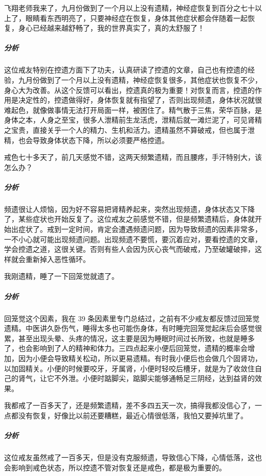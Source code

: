 \begin{case}
    飞翔老师我来了，九月份做到了一个月以上没有遗精，神经症恢复到百分之七十以上了，眼睛看东西明亮了，只要神经症在恢复，身体其他症状都会伴随着一起恢复，身心已经越来越舒畅了，我的世界真实了，真的太舒服了！
    \subparagraph{分析} 这位戒友特别在控遗方面下了功夫，认真研读了控遗的文章，自己也有控遗的经验，九月份做到了一个月以上没有遗精，神经症恢复很多，其他症状也恢复不少，身心大为改善。从这个反馈可以看出，控遗真的极为重要！对恢复而言，控遗的作用是决定性的，控遗做得好，身体恢复就有指望了，否则出现频遗，身体状况就很难起色，就像做事情无法打开局面一样，被困住了。精气散于三焦，荣华百脉，是身体之本，人身之至宝，很多人泄精前生龙活虎，泄精后就一滩烂泥了，可见肾精之宝贵，直接关乎一个人的精力、生机和活力。遗精虽然不算破戒，但也属于泄精，也会导致身体状态下降，所以必须要严格控遗。
\end{case}

\begin{case}
    戒色七十多天了，前几天感觉不错，这两天频繁遗精，而且腰疼，手汗特别大，该怎么办？
    \subparagraph{分析} 频遗很让人烦恼，因为好不容易把肾精养起来，突然出现频遗，身体状态又下降了，某些症状也开始反复了。这位戒友之前感觉不错，但是频繁遗精后，身体就开始出症状了。戒到一定时间，肯定会遭遇频遗问题，因为导致频遗的因素非常多，一不小心就可能出现频遗问题。出现频遗不要慌，要沉着应对，要看控遗的文章，学会控遗之道，这很关键。否则有些人会因为灰心丧气而破戒，乃至破罐破摔，这样就会重新掉入恶性循环。
\end{case}

\begin{case}
    我刚遗精，睡了一下回笼觉就遗了。
    \subparagraph{分析} 回笼觉这个因素，我在 39 条因素里专门总结过，之前有不少戒友都反馈过回笼觉遗精。中医讲久卧伤气，睡得太多也可能伤身体，有时睡完回笼觉起床后会感觉很累，甚至出现头晕、头疼的情况，这主要是因为睡眠时间过长所致，也就是睡多了，也会影响到了人的精神和体力。三四点起来小便后回笼觉，遗精的概率会增加，因为小便会导致精关松动，所以更易遗精。有时我小便后也会做几个固肾功，以加固精关。小便的时候要咬牙，牙属肾，小便时轻咬后槽牙，就是为了收敛住自己的肾气，让它不外泄。小便时踮脚尖，踮脚尖能够通畅足三阴经，达到益肾的效果。
\end{case}

\begin{case}
    我都戒了一百多天了，还是频繁遗精，差不多四五天一次，搞得我都没信心了，一点都没有恢复，好像比以前还要糟糕，最近心情很低落，我怕又要掉坑里了。
    \subparagraph{分析} 这位戒友虽然戒了一百多天，但是没有克服频遗，导致信心下降，心情低落，这也会影响到戒色状态，所以控遗不管对恢复还是戒色，都是极为重要的。
\end{case}

